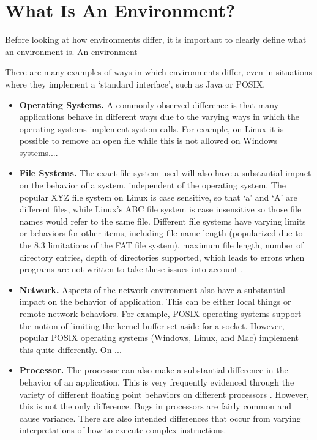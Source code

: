 \section{What Is An Environment?}

Before looking at how environments differ, it is important to clearly
define what an environment is.  An environment 

There are many examples of ways in which environments differ, even in
situations where they implement a `standard interface', such as Java or
POSIX. 

\begin{itemize}

\item {\bf Operating Systems.}  A commonly observed difference is that many
applications behave in different ways due to the varying ways in which the
operating systems implement system calls.  For example, on Linux it is 
possible to remove an open file while this is 
not allowed on Windows systems.... 


\item {\bf File Systems.}  The exact file system used will also have a
substantial impact on the behavior of a system, independent of the
operating system.  The popular XYZ file system on Linux is case 
sensitive, so that `a' and `A' are different files, while Linux's ABC file 
system is case insensitive so those file names would refer to the same
file.  Different file systems have varying limits or behaviors for other 
items, including file name length (popularized due to the 8.3 limitations
of the FAT file system), maximum file length, number of directory entries, 
depth of directories supported, which leads to errors when programs are not
written to take these issues into account . 

\item {\bf Network.}  Aspects of the network environment also have a 
substantial impact on the behavior of application.  This can be either
local things or remote network behaviors.  For example, POSIX operating
systems support the notion of limiting the kernel buffer set aside for a
socket.  However, popular POSIX operating systems (Windows, Linux, and Mac) 
implement this quite differently.  On ... 

\item {\bf Processor.}  The processor can also make a substantial
difference in the behavior of an application.  This is very frequently
evidenced through the variety of different floating point behaviors on
different processors .  However, this is not the only
difference.  Bugs in processors are fairly common and cause variance.
There are also intended differences that occur from varying interpretations
of how to execute complex instructions.  


\end{itemize}

